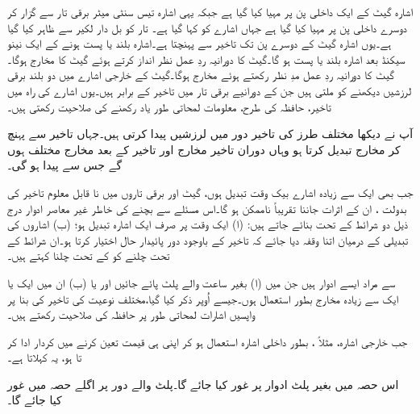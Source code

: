  اشارہ   گیٹ کے ایک داخلی پن پر مہیا کیا گیا ہے جبکہ یہی  اشارہ تیس سنٹی میٹر  برقی تار سے  گزار کر دوسرے داخلی پن پر مہیا کیا گیا ہے جہاں اشارے کو  کہا گیا ہے۔ تار کو بل دار لکیر سے ظاہر کیا گیا ہے۔یوں اشارہ  گیٹ کے  دوسرے پن تک تاخیر سے پہنچتا ہے۔اشارہ   بلند یا پست ہونے کے ایک نینو سیکنڈ بعد اشارہ   بلند یا پست ہو گا۔گیٹ کا دورانیہ ردِ عمل نظر انداز کرتے ہوئے گیٹ کا  مخارج   ہوگا۔ گیٹ کا دورانیہ ردِ عمل مدِ نظر رکھتے ہوئے مخارج   ہوگا۔گیٹ کے خارجی اشارے میں دو بلند برقی لرزشیں  دیکھنے کو ملتی ہیں جن کے دورانیے برقی تار میں تاخیر کے برابر ہیں۔یوں اشارے  کی راہ میں  تاخیر،   حافظہ کی طرح، معلومات   لمحاتی طور یاد  رکھنے کی صلاحیت رکھتی ہیں۔

آپ نے دیکھا مختلف طرز کی  تاخیر  دور میں لرزشیں پیدا  کرتی ہیں۔جہاں تاخیر سے پہنچ کر مخارج تبدیل کرتا ہو وہاں دوران تاخیر مخارج اور تاخیر کے بعد مخارج مختلف ہوں گے  جس سے   پیدا ہو گی۔

 جب بھی ایک سے زیادہ اشارے بیک وقت تبدیل ہوں، گیٹ اور برقی تاروں میں نا قابل  معلوم  تاخیر کی بدولت   ، ان کے اثرات جاننا   تقریباً ناممکن ہو گا۔اس مسئلے سے بچنے کی خاطر  غیر معاصر ادوار  درج ذیل دو شرائط کے تحت  بنائے جاتے ہیں: (ا)  ایک وقت پر صرف ایک  اشارہ تبدیل ہو؛ (ب)  اشاروں  کی تبدیلی کے درمیان اتنا وقفہ دیا  جائے کہ  تاخیر کے باوجود دور  پائیدار حال اختیار کرتا ہو۔ان شرائط کے تحت  چلنے کو   کے تحت چلنا کہتے ہیں۔

 سے مراد ایسے  ادوار ہیں جن میں  (ا) بغیر ساعت   والے پلٹ پائے جائیں اور یا   (ب) ان میں ایک یا ایک سے زیادہ مخارج بطور  استعمال ہوں۔جیسے اُوپر ذکر کیا گیا،مختلف نوعیت کی  تاخیر کی بنا پر  واپسیں اشارات لمحاتی طور پر    حافظہ کی صلاحیت رکھتے ہیں۔

جب   خارجی اشارہ، مثلاً ،   بطور داخلی اشارہ  استعمال  ہو کر  اپنی  ہی قیمت  تعین کرنے میں کردار ادا کر تا ہو،  یہ   کہلاتا ہے۔

اس حصہ میں بغیر پلٹ  ادوار پر غور کیا جائے گا۔پلٹ والے دور پر اگلے حصہ میں غور کیا جائے گا۔

